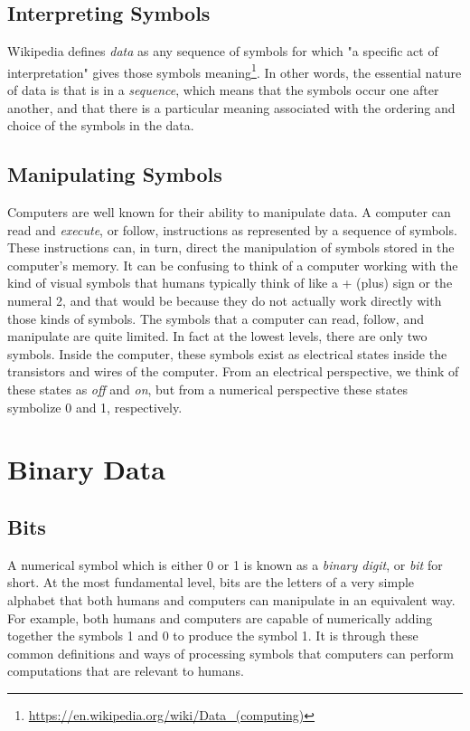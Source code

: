 \documentclass{book}
\newcommand{\newterm}[2]{\textit{#1}\index{#2}}
\begin{document}
\subsection{Interpreting Symbols}
Wikipedia defines
\newterm{data}{Data} as any sequence of symbols for which "a specific act of
interpretation" gives those symbols
meaning\footnote{\url{https://en.wikipedia.org/wiki/Data\_(computing)}}.
In other words, the essential nature of data is that is in a
\newterm{sequence}{Sequence}, which means that the symbols occur one after
another, and that there is a particular meaning associated with 
the ordering and choice of the symbols in the data.

\subsection{Manipulating Symbols}

Computers are well known for their ability to manipulate data.
A computer can read and \newterm{execute}{Execution}, or follow,
instructions as represented by a sequence of symbols.
These instructions can, in
turn, direct the manipulation of symbols stored in the computer's memory.
It can be confusing to think of a computer working with the kind of visual
symbols that humans typically think of like a + (plus) sign or the numeral 2,
and that would be because they do not actually work directly with those
kinds of symbols.
The symbols that a computer can read, follow, and manipulate are quite limited.
In fact at the lowest levels, there are only two symbols. Inside the computer,
these symbols exist as electrical states inside the transistors and wires of 
the computer. From an electrical perspective, we think of these states as 
\textit{off} and \textit{on}, but from a numerical perspective these states 
symbolize 0 and 1, respectively.

\section{Binary Data}\label{bindata}
\subsection{Bits}
A numerical symbol which is either 0 or 1 is known as a
\newterm{binary digit}{Binary Digit}, or \newterm{bit}{Bit} for short.
At the most fundamental level, bits are the letters of a very simple
alphabet that both humans and computers can manipulate in an
equivalent way. For example, both humans and computers are capable 
of numerically adding together the symbols 1 and 0 to produce the 
symbol 1. It is through these common definitions and ways of processing
symbols that computers can perform computations
that are relevant to humans.
\end{document}
